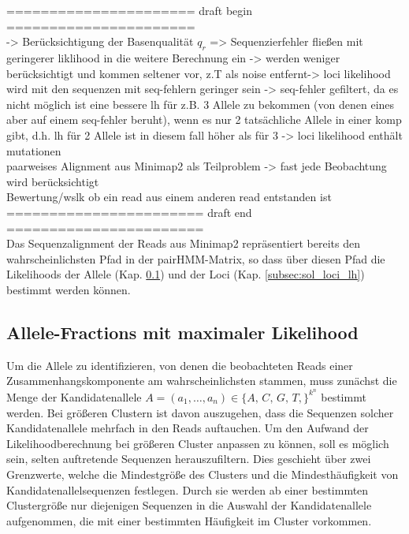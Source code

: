 \noindent====================== draft begin ======================\\

-> Berücksichtigung der Basenqualität $q_{r}$ => Sequenzierfehler fließen mit geringerer liklihood in die weitere Berechnung ein -> werden weniger berücksichtigt und kommen seltener vor, z.T als noise entfernt-> loci likelihood wird mit den sequenzen mit seq-fehlern geringer sein -> seq-fehler gefiltert, da es nicht möglich ist eine  bessere lh für z.B. 3 Allele zu bekommen (von denen eines aber auf einem seq-fehler beruht), wenn es nur 2 tatsächliche Allele in einer komp gibt, d.h. lh für 2 Allele ist in diesem fall höher als für 3 -> loci likelihood enthält mutationen \\
paarweises Alignment aus Minimap2 als Teilproblem -> fast jede Beobachtung wird berücksichtigt\\
Bewertung/wslk ob ein read aus einem anderen read entstanden ist\\

\noindent======================= draft end =======================\\

Das Sequenzalignment der Reads aus Minimap2 repräsentiert bereits den wahrscheinlichsten Pfad in der pairHMM-Matrix, so dass über diesen Pfad die Likelihoods der Allele (Kap. \ref{subsec:sol_allele_lh}) und der Loci (Kap. \ref{subsec:sol_loci_lh}) bestimmt werden können.

\subsection{Allele-Fractions mit maximaler Likelihood} \label{subsec:sol_allele_lh}

Um die Allele zu identifizieren, von denen die beobachteten Reads einer Zusammenhangskomponente am wahrscheinlichsten stammen, muss zunächst die Menge der Kandidatenallele $A=(a_{1}, \dots, a_{n}) \in \{A,\,C,\,G,\,T,\}^{k^n}$ bestimmt werden. Bei größeren Clustern ist davon auszugehen, dass die Sequenzen solcher Kandidatenallele mehrfach in den Reads auftauchen. Um den Aufwand der Likelihoodberechnung bei größeren Cluster anpassen zu können, soll es möglich sein, selten auftretende Sequenzen herauszufiltern. Dies geschieht über zwei Grenzwerte, welche die Mindestgröße des Clusters und die Mindesthäufigkeit von Kandidatenallelsequenzen festlegen. Durch sie werden ab einer bestimmten Clustergröße nur diejenigen Sequenzen in die Auswahl der Kandidatenallele aufgenommen, die mit einer bestimmten Häufigkeit im Cluster vorkommen.\\

